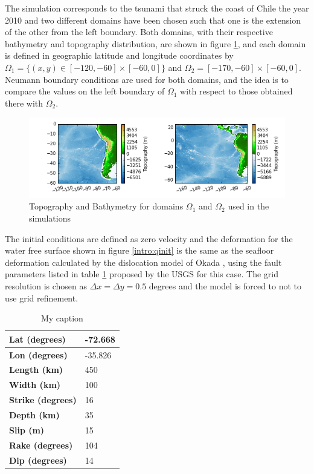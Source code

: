 The simulation corresponds to the tsunami that struck the coast of Chile the year 2010 and two different domains have been chosen such that one is the extension of the other from the left boundary. Both domains, with their respective bathymetry and topography distribution, are shown in figure \ref{intro:topobati}, and each domain is defined in geographic latitude and longitude coordinates by $\Omega_1 = \{ (x,y)\in[-120,-60]\times[-60,0] \}$ and $\Omega_2 = [-170,-60]\times [-60,0]$. Neumann boundary conditions are used for both domains, and the idea is to compare the values on the left boundary of $\Omega_1$ with respect to those obtained there with $\Omega_2$.

\begin{figure}
	\center
	\includegraphics[width=\textwidth]{figures/GeoclawChile2010_domains_topo.png}
	\caption{Topography and Bathymetry for domains $\Omega_1$ and $\Omega_2$ used in the simulations}
	\label{intro:topobati}
\end{figure}

The initial conditions are defined as zero velocity and the deformation for the water free surface shown in figure \ref{intro:qinit} is the same as the seafloor deformation calculated by the dislocation model of Okada \cite{okada1985surface}, using the fault parameters listed in table \ref{intro:faulttable} proposed by the USGS for this case. The grid resolution is chosen as $\Delta x = \Delta y = 0.5$ degrees and the model is forced to not to use grid refinement. 

\begin{table}[]
\centering
\caption{My caption}
\label{my-label}
\begin{tabular}{|l|l|}
\hline
\textbf{Lat (degrees)}    & -72.668 \\ \hline
\textbf{Lon (degrees)}    & -35.826 \\ \hline
\textbf{Length (km)}      & 450     \\ \hline
\textbf{Width (km)}       & 100     \\ \hline
\textbf{Strike (degrees)} & 16      \\ \hline
\textbf{Depth (km)}       & 35      \\ \hline
\textbf{Slip (m)}         & 15      \\ \hline
\textbf{Rake (degrees)}   & 104     \\ \hline
\textbf{Dip (degrees)}    & 14      \\ \hline
\end{tabular}
\label{intro:faulttable}
\end{table}

